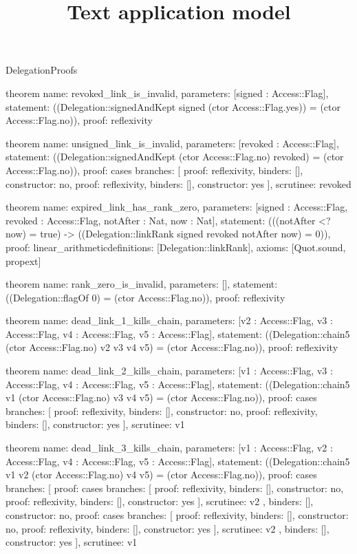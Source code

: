 \begin{lexlean}{DelegationProofs}
\title{Text application model}
\begin{semanticmodule}
theorem{
  name: revoked_link_is_invalid,
  parameters: [signed : Access::Flag],
  statement: ((Delegation::signedAndKept signed (ctor Access::Flag.yes)) = (ctor Access::Flag.no)),
  proof: reflexivity{}
}

theorem{
  name: unsigned_link_is_invalid,
  parameters: [revoked : Access::Flag],
  statement: ((Delegation::signedAndKept (ctor Access::Flag.no) revoked) = (ctor Access::Flag.no)),
  proof: cases{
    branches: [
      {proof: reflexivity{}, binders: [], constructor: no},
      {proof: reflexivity{}, binders: [], constructor: yes}
    ],
    scrutinee: revoked
  }
}

theorem{
  name: expired_link_has_rank_zero,
  parameters: [signed : Access::Flag, revoked : Access::Flag, notAfter : Nat, now : Nat],
  statement: (((notAfter <? now) = true) -> ((Delegation::linkRank signed revoked notAfter now) = 0)),
  proof: linear_arithmetic{definitions: [Delegation::linkRank]},
  axioms: [Quot.sound, propext]
}

theorem{
  name: rank_zero_is_invalid,
  parameters: [],
  statement: ((Delegation::flagOf 0) = (ctor Access::Flag.no)),
  proof: reflexivity{}
}

theorem{
  name: dead_link_1_kills_chain,
  parameters: [v2 : Access::Flag, v3 : Access::Flag, v4 : Access::Flag, v5 : Access::Flag],
  statement: ((Delegation::chain5 (ctor Access::Flag.no) v2 v3 v4 v5) = (ctor Access::Flag.no)),
  proof: reflexivity{}
}

theorem{
  name: dead_link_2_kills_chain,
  parameters: [v1 : Access::Flag, v3 : Access::Flag, v4 : Access::Flag, v5 : Access::Flag],
  statement: ((Delegation::chain5 v1 (ctor Access::Flag.no) v3 v4 v5) = (ctor Access::Flag.no)),
  proof: cases{
    branches: [
      {proof: reflexivity{}, binders: [], constructor: no},
      {proof: reflexivity{}, binders: [], constructor: yes}
    ],
    scrutinee: v1
  }
}

theorem{
  name: dead_link_3_kills_chain,
  parameters: [v1 : Access::Flag, v2 : Access::Flag, v4 : Access::Flag, v5 : Access::Flag],
  statement: ((Delegation::chain5 v1 v2 (ctor Access::Flag.no) v4 v5) = (ctor Access::Flag.no)),
  proof: cases{
    branches: [
      {proof: cases{
        branches: [
          {proof: reflexivity{}, binders: [], constructor: no},
          {proof: reflexivity{}, binders: [], constructor: yes}
        ],
        scrutinee: v2
      }, binders: [], constructor: no},
      {proof: cases{
        branches: [
          {proof: reflexivity{}, binders: [], constructor: no},
          {proof: reflexivity{}, binders: [], constructor: yes}
        ],
        scrutinee: v2
      }, binders: [], constructor: yes}
    ],
    scrutinee: v1
  }
}


\end{semanticmodule}
\end{lexlean}
